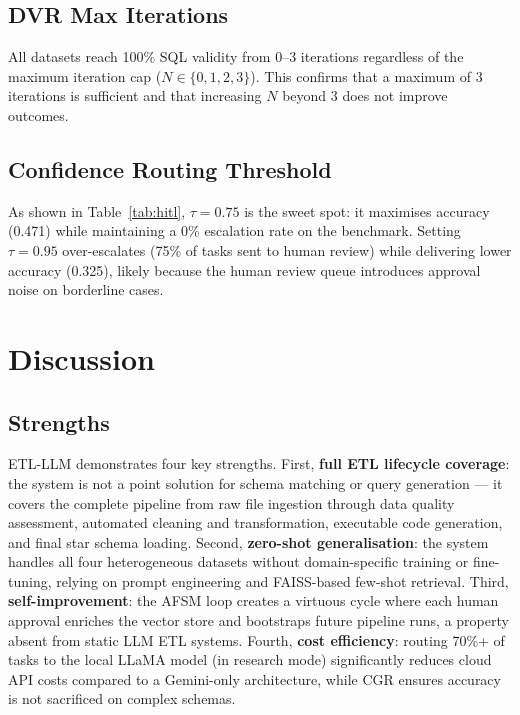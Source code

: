 \documentclass[9pt,a4paper,twocolumn,twoside]{rho-class/rho}
\begin{document}
    \subsection{DVR Max Iterations}

        All datasets reach 100\% SQL validity from 0--3 iterations regardless of the maximum iteration cap ($N \in \{0, 1, 2, 3\}$). This confirms that a maximum of 3 iterations is sufficient and that increasing $N$ beyond 3 does not improve outcomes.

    \subsection{Confidence Routing Threshold}

        As shown in Table~\ref{tab:hitl}, $\tau = 0.75$ is the sweet spot: it maximises accuracy (0.471) while maintaining a 0\% escalation rate on the benchmark. Setting $\tau = 0.95$ over-escalates (75\% of tasks sent to human review) while delivering lower accuracy (0.325), likely because the human review queue introduces approval noise on borderline cases.


\section{Discussion}
\label{sec:discussion}

    \subsection{Strengths}

        \textsc{ETL-LLM} demonstrates four key strengths. First, \textbf{full ETL lifecycle coverage}: the system is not a point solution for schema matching or query generation --- it covers the complete pipeline from raw file ingestion through data quality assessment, automated cleaning and transformation, executable code generation, and final star schema loading. Second, \textbf{zero-shot generalisation}: the system handles all four heterogeneous datasets without domain-specific training or fine-tuning, relying on prompt engineering and FAISS-based few-shot retrieval. Third, \textbf{self-improvement}: the AFSM loop creates a virtuous cycle where each human approval enriches the vector store and bootstraps future pipeline runs, a property absent from static LLM ETL systems. Fourth, \textbf{cost efficiency}: routing 70\%+ of tasks to the local LLaMA model (in research mode) significantly reduces cloud API costs compared to a Gemini-only architecture, while CGR ensures accuracy is not sacrificed on complex schemas.
\end{document}
